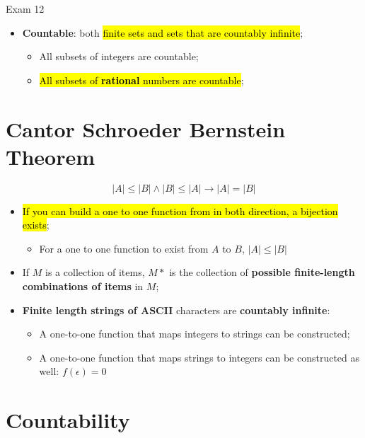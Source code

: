 \documentclass{note}
\begin{document}
\begin{note}{Exam 12}
\begin{itemize}
    \item \textbf{Countable}: both \hl{finite sets and sets that are countably infinite}; 
    \begin{itemize}
        \item All subsets of integers are countable;
        \item \hl{All subsets of \textbf{rational} numbers are countable};
    \end{itemize}
\end{itemize}

\section{Cantor Schroeder Bernstein Theorem}

\begin{equation}
    \left| A \right| \leq \left| B \right| \wedge \left| B \right| \leq \left| A \right| \to \left| A \right| = \left| B \right|
\end{equation}

\begin{itemize}
    \item \hl{If you can build a one to one function from in both direction, a bijection exists};
    \begin{itemize}
        \item For a one to one function to exist from $ A $ to $ B $, $ \left| A \right| \leq \left| B \right| $
    \end{itemize}
    
    \item If $ M $ is a collection of items, $ M * $ is the collection of \textbf{possible finite-length combinations of items} in $ M $;
    
    \item \textbf{Finite length strings of ASCII} characters are \textbf{countably infinite}:
    \begin{itemize}
        \item A one-to-one function that maps integers to strings can be constructed;
        \item A one-to-one function that maps strings to integers can be constructed as well: $ f(\epsilon) = 0  $
    \end{itemize}
\end{itemize}

\section{Countability}


\end{note}
\end{document}
